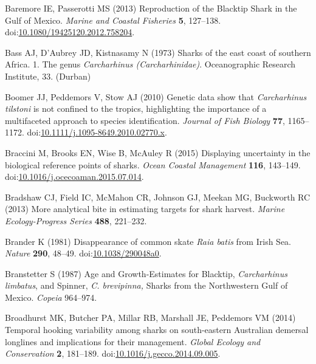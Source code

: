 \documentclass[]{article}
\begin{document}
\leavevmode\hypertarget{ref-baremore_reproduction_2013}{}%
Baremore IE, Passerotti MS (2013) Reproduction of the Blacktip Shark in
the Gulf of Mexico. \emph{Marine and Coastal Fisheries} \textbf{5},
127--138.
doi:\href{https://doi.org/10.1080/19425120.2012.758204}{10.1080/19425120.2012.758204}.

\leavevmode\hypertarget{ref-bass_sharks_1973}{}%
Bass AJ, D'Aubrey JD, Kistnasamy N (1973) Sharks of the east coast of
southern Africa. 1. The genus \emph{Carcharhinus (Carcharhinidae)}.
Oceanographic Research Institute, 33. (Durban)

\leavevmode\hypertarget{ref-boomer_genetic_2010}{}%
Boomer JJ, Peddemors V, Stow AJ (2010) Genetic data show that
\emph{Carcharhinus tilstoni} is not confined to the tropics,
highlighting the importance of a multifaceted approach to species
identification. \emph{Journal of Fish Biology} \textbf{77}, 1165--1172.
doi:\href{https://doi.org/10.1111/j.1095-8649.2010.02770.x}{10.1111/j.1095-8649.2010.02770.x}.

\leavevmode\hypertarget{ref-braccini_displaying_2015}{}%
Braccini M, Brooks EN, Wise B, McAuley R (2015) Displaying uncertainty
in the biological reference points of sharks. \emph{Ocean Coastal
Management} \textbf{116}, 143--149.
doi:\href{https://doi.org/10.1016/j.ocecoaman.2015.07.014}{10.1016/j.ocecoaman.2015.07.014}.

\leavevmode\hypertarget{ref-bradshaw_more_2013}{}%
Bradshaw CJ, Field IC, McMahon CR, Johnson GJ, Meekan MG, Buckworth RC
(2013) More analytical bite in estimating targets for shark harvest.
\emph{Marine Ecology-Progress Series} \textbf{488}, 221--232.

\leavevmode\hypertarget{ref-brander_disappearance_1981}{}%
Brander K (1981) Disappearance of common skate \emph{Raia batis} from
Irish Sea. \emph{Nature} \textbf{290}, 48--49.
doi:\href{https://doi.org/10.1038/290048a0}{10.1038/290048a0}.

\leavevmode\hypertarget{ref-branstetter_age_1987}{}%
Branstetter S (1987) Age and Growth-Estimates for Blacktip,
\emph{Carcharhinus limbatus}, and Spinner, \emph{C. brevipinna,} Sharks
from the Northwestern Gulf of Mexico. \emph{Copeia} 964--974.

\leavevmode\hypertarget{ref-broadhurst_temporal_2014}{}%
Broadhurst MK, Butcher PA, Millar RB, Marshall JE, Peddemors VM (2014)
Temporal hooking variability among sharks on south-eastern Australian
demersal longlines and implications for their management. \emph{Global
Ecology and Conservation} \textbf{2}, 181--189.
doi:\href{https://doi.org/10.1016/j.gecco.2014.09.005}{10.1016/j.gecco.2014.09.005}.
\end{document}
